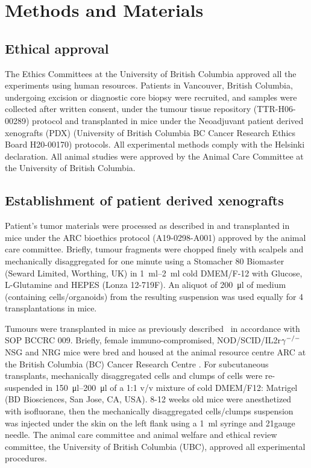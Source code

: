 \chapter{Methods and Materials}

\section{Ethical approval}
The Ethics Committees at the University of British Columbia approved all the experiments using human resources. Patients in Vancouver, British Columbia, undergoing excision or diagnostic core biopsy were recruited, and samples were collected after written consent, under the tumour tissue repository (TTR-H06-00289) protocol and transplanted in mice under the Neoadjuvant patient derived xenografts (PDX) (University of British Columbia BC Cancer Research Ethics Board H20-00170) protocols. All experimental methods comply with the Helsinki declaration. All animal studies were approved by the Animal Care Committee at the University of British Columbia.  


\section{Establishment of patient derived xenografts} 
Patient's tumor materials were processed as described in \cite{eirew2015dynamics} and transplanted in mice under the \ac{ARC} bioethics protocol (A19-0298-A001) approved by the animal care committee.
Briefly, tumour fragments were chopped finely with scalpels and mechanically disaggregated for one minute using a Stomacher 80 Biomaster (Seward Limited, Worthing, UK) in \SIrange{1}{2}{\ml} cold DMEM/F-12 with Glucose, L-Glutamine and HEPES (Lonza 12-719F).
An aliquot of \SI{200}{\ul} of medium (containing cells/organoids) from the resulting suspension was used equally for 4 transplantations in mice.

Tumours were transplanted in mice as previously described~\cite{eirew2015dynamics} in accordance with SOP BCCRC 009. 
Briefly, female immuno-compromised, NOD/SCID/IL2r$\gamma^{\small{-/-}}$\ac{NSG} and        
\ac{NRG} \cite{pearson2008non} mice were bred and housed at the animal resource centre \ac{ARC} at the British Columbia (BC) Cancer Research Centre . 
For subcutaneous transplants, mechanically disaggregated cells and clumps of cells were re-suspended in \SIrange{150}{200}{\ul} of a 1:1 v/v mixture of cold DMEM/F12: Matrigel (BD Biosciences, San Jose, CA, USA).
8-12 weeks old mice were anesthetized with isofluorane, then the mechanically disaggregated cells/clumps suspension was injected under the skin on the left flank using a \SI{1}{\ml} syringe and 21gauge needle. 
The animal care committee and animal welfare and ethical review committee, the University of British Columbia (UBC), approved all experimental procedures.

